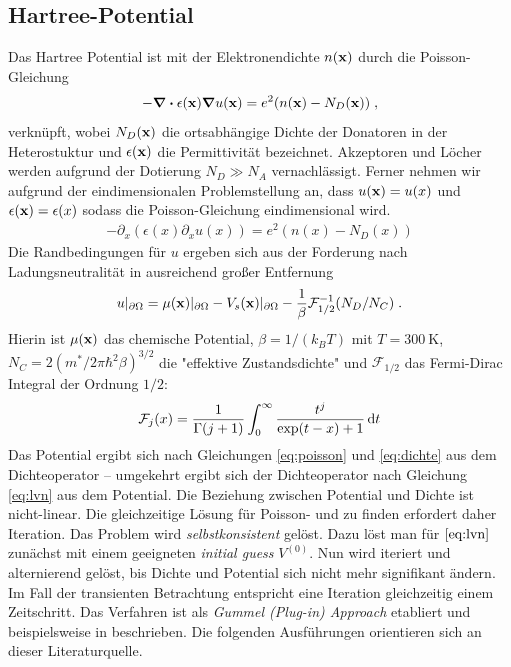 \subsection{Hartree-Potential}
Das Hartree Potential ist mit der Elektronendichte $n(\vb{x})$ durch die Poisson-Gleichung \cite{frensley}
\begin{align}
  -\div \epsilon(\vb{x}) \grad u(\vb{x}) = e^2 (n(\vb{x}) - N_D(\vb{x})) \; ,
  \label{eq:poisson_3d}
\end{align}
verknüpft, wobei $N_D(\vb{x})$ die ortsabhängige Dichte der Donatoren in der Heterostuktur und $\epsilon(\vb{x})$ die Permittivität bezeichnet. Akzeptoren und Löcher werden aufgrund der Dotierung $N_D \gg N_A$ vernachlässigt. Ferner nehmen wir aufgrund der eindimensionalen Problemstellung an, dass $u(\vb{x}) = u(x)$ und $\epsilon(\vb{x})=\epsilon(x)$ sodass die Poisson-Gleichung eindimensional wird.
\begin{align}
  -\partial_x (\epsilon(x)\partial_x u(x)) = e^2(n(x)-N_D(x))
  \label{eq:poisson}
\end{align}
Die Randbedingungen für $u$ ergeben sich aus der Forderung nach Ladungsneutralität in ausreichend großer Entfernung  \cite{frensley}
\begin{align}
  u|_{\partial\Omega} = \mu(\vb{x})|_{\partial\Omega}-V_s(\vb{x})|_{\partial\Omega}-\frac{1}{\beta}\mathcal{F}_{1/2}^{-1}(N_D/N_C) \; .
  \label{eq:RB_PE}
\end{align}
Hierin ist $\mu(\vb{x})$ das chemische Potential, $\beta=1/(k_BT)$ mit $T=\SI{300}{\kelvin}$, $N_C = 2(m^*/2\pi\hbar^2\beta)^{3/2}$ die "effektive Zustandsdichte" und $\mathcal{F}_{1/2}$ das Fermi-Dirac Integral der Ordnung $1/2$:
\begin{align}
  \mathcal{F}_j(x)=\frac{1}{\Gamma(j+1)}\int_0^{\infty}\frac{t^j}{\exp(t-x)+1}\mathop{}\!\mathrm{d} t
\end{align}
Das Potential ergibt sich nach Gleichungen \eqref{eq:poisson} und \eqref{eq:dichte} aus dem Dichteoperator -- umgekehrt ergibt sich der Dichteoperator nach Gleichung \eqref{eq:lvn} aus dem Potential. Die Beziehung zwischen Potential und Dichte ist nicht-linear. Die gleichzeitige Lösung für Poisson- und \lvn zu finden erfordert daher Iteration. Das Problem wird \emph{selbstkonsistent} gelöst. Dazu löst man für $\eqref{eq:lvn}$ zunächst mit einem geeigneten \emph{initial guess} $V^{(0)}$. Nun wird iteriert und alternierend gelöst, bis Dichte und Potential sich nicht mehr signifikant ändern. Im Fall der transienten Betrachtung entspricht eine Iteration gleichzeitig einem Zeitschritt. Das Verfahren ist als \emph{Gummel (Plug-in) Approach} etabliert und beispielsweise in \cite{gummel} beschrieben. Die folgenden Ausführungen orientieren sich an dieser Literaturquelle.

